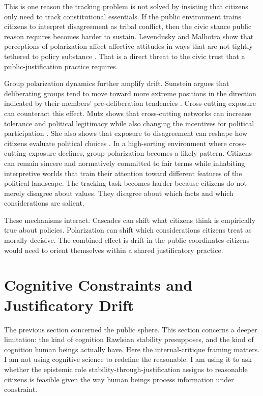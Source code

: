 \documentclass[12pt]{article}
\begin{document}
This is one reason the tracking problem is not solved by insisting that citizens only need to track constitutional essentials. If the public environment trains citizens to interpret disagreement as tribal conflict, then the civic stance public reason requires becomes harder to sustain. Levendusky and Malhotra show that perceptions of polarization affect affective attitudes in ways that are not tightly tethered to policy substance \parencite[p.~290]{levenduskyMalhotra2016polarization}. That is a direct threat to the civic trust that a public-justification practice requires.

Group polarization dynamics further amplify drift. Sunstein argues that deliberating groups tend to move toward more extreme positions in the direction indicated by their members' pre-deliberation tendencies \parencite[p.~176]{sunstein2002groupPolarization}. Cross-cutting exposure can counteract this effect. Mutz shows that cross-cutting networks can increase tolerance and political legitimacy while also changing the incentives for political participation \parencite[p.~111]{mutz2002crosscutting}. She also shows that exposure to disagreement can reshape how citizens evaluate political choices \parencite[p.~122]{mutz2002crosscutting}. In a high-sorting environment where cross-cutting exposure declines, group polarization becomes a likely pattern. Citizens can remain sincere and normatively committed to fair terms while inhabiting interpretive worlds that train their attention toward different features of the political landscape. The tracking task becomes harder because citizens do not merely disagree about values. They disagree about which facts and which considerations are salient.

These mechanisms interact. Cascades can shift what citizens think is empirically true about policies. Polarization can shift which considerations citizens treat as morally decisive. The combined effect is drift in the public coordinates citizens would need to orient themselves within a shared justificatory practice.

\section{Cognitive Constraints and Justificatory Drift}

The previous section concerned the public sphere. This section concerns a deeper limitation: the kind of cognition Rawlsian stability presupposes, and the kind of cognition human beings actually have. Here the internal-critique framing matters. I am not using cognitive science to redefine the reasonable. I am using it to ask whether the epistemic role stability-through-justification assigns to reasonable citizens is feasible given the way human beings process information under constraint.
\end{document}
